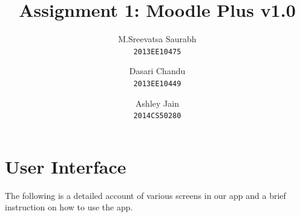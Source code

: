 \documentclass[12pt]{article}
\begin{document}
\author{
  M.Sreevatsa Saurabh\\
  \texttt{2013EE10475}
  \and
  Dasari Chandu\\
  \texttt{2013EE10449}
  \and
  Ashley Jain\\
  \texttt{2014CS50280}
}
\title{Assignment 1: Moodle Plus v1.0}
\maketitle

\section{User Interface}

The following is a detailed account of various screens in our app and a brief instruction on how to use the app.
\end{document}
